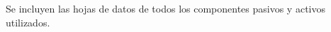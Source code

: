 

Se incluyen las hojas de datos de todos los componentes pasivos y activos utilizados.








%

%

%